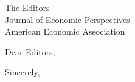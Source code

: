 \documentclass[11pt,a4paper]{letter}
\begin{document}
\begin{letter}{The Editors \\ Journal of Economic Perspectives \\ American Economic Association}

\opening{Dear Editors,}

%

\closing{Sincerely,}

\end{letter}
\end{document}
